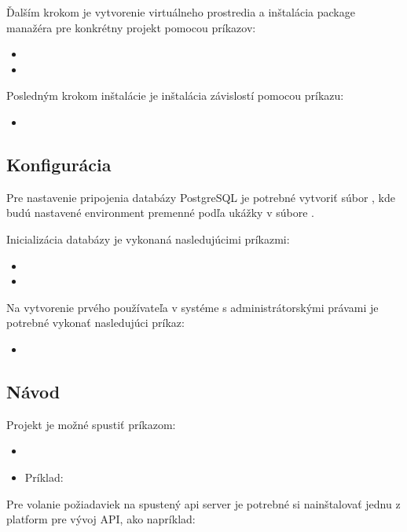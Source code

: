 Ďalším krokom je vytvorenie virtuálneho prostredia a inštalácia package manažéra  pre konkrétny projekt pomocou príkazov:
\begin{itemize}
\item {}
\item {}
\end{itemize}

Posledným krokom inštalácie je inštalácia závislostí pomocou príkazu:
\begin{itemize}
\item {}
\end{itemize}

\subsection{Konfigurácia}

Pre nastavenie pripojenia databázy PostgreSQL je potrebné vytvoriť súbor , kde budú nastavené environment
premenné podľa ukážky v súbore .
\newpage

Inicializácia databázy je vykonaná nasledujúcimi príkazmi:
\begin{itemize}
\item {}
\item {}
\end{itemize}

Na vytvorenie prvého používateľa v systéme s administrátorskými právami je potrebné vykonať nasledujúci príkaz:
\begin{itemize}
\item {}
\end{itemize}

\subsection{Návod}

Projekt je možné spustiť príkazom:
\begin{itemize}
\item {}
\item Príklad: 
\end{itemize}

Pre volanie požiadaviek na spustený api server je potrebné si nainštalovať jednu z platform pre vývoj API, ako napríklad:

